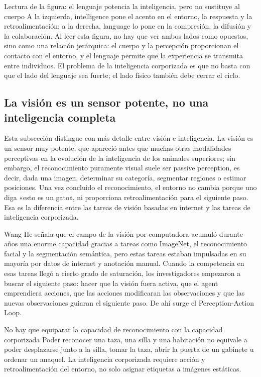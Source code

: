 \documentclass[a4paper]{article}
\begin{document}
\begin{knowledgebox}{Lectura de la figura: el lenguaje potencia la inteligencia, pero no sustituye al cuerpo}
A la izquierda, intelligence pone el acento en el entorno, la respuesta y la retroalimentación; a la derecha, language lo pone en la compresión, la difusión y la colaboración. Al leer esta figura, no hay que ver ambos lados como opuestos, sino como una relación jerárquica: el cuerpo y la percepción proporcionan el contacto con el entorno, y el lenguaje permite que la experiencia se transmita entre individuos. El problema de la inteligencia corporizada es que no basta con que el lado del lenguaje sea fuerte; el lado físico también debe cerrar el ciclo.
\end{knowledgebox}

\subsection{La visión es un sensor potente, no una inteligencia completa}

Esta subsección distingue con más detalle entre visión e inteligencia. La visión es un sensor muy potente, que apareció antes que muchas otras modalidades perceptivas en la evolución de la inteligencia de los animales superiores; sin embargo, el reconocimiento puramente visual suele ser passive perception, es decir, dada una imagen, determinar su categoría, segmentar regiones o estimar posiciones. Una vez concluido el reconocimiento, el entorno no cambia porque uno diga «esto es un gato», ni proporciona retroalimentación para el siguiente paso. Esa es la diferencia entre las tareas de visión basadas en internet y las tareas de inteligencia corporizada.

Wang He señala que el campo de la visión por computadora acumuló durante años una enorme capacidad gracias a tareas como ImageNet, el reconocimiento facial y la segmentación semántica, pero estas tareas estaban impulsadas en su mayoría por datos de internet y anotación manual. Cuando la competencia en esas tareas llegó a cierto grado de saturación, los investigadores empezaron a buscar el siguiente paso: hacer que la visión fuera activa, que el agent emprendiera acciones, que las acciones modificaran las observaciones y que las nuevas observaciones guiaran el siguiente paso. De ahí surge el Perception-Action Loop.

\begin{warningbox}{No hay que equiparar la capacidad de reconocimiento con la capacidad corporizada}
Poder reconocer una taza, una silla y una habitación no equivale a poder desplazarse junto a la silla, tomar la taza, abrir la puerta de un gabinete u ordenar un anaquel. La inteligencia corporizada requiere acción y retroalimentación del entorno, no solo asignar etiquetas a imágenes estáticas.
\end{warningbox}
\end{document}
